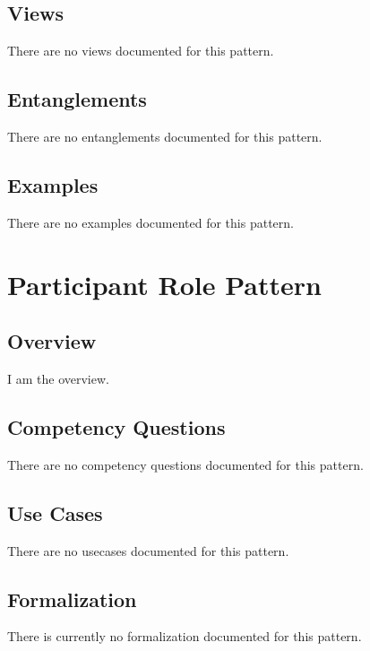 \subsection{Views}
\label{ssec:views}
There are no views documented for this pattern.


\subsection{Entanglements}
\label{ssec:entanglements}
There are no entanglements documented for this pattern.

\subsection{Examples}
\label{ssec:examples}
There are no examples documented for this pattern.


\section{Participant Role Pattern}
\label{sec:participant-role-pattern}
\subsection{Overview}
\label{ssec:overview}
I am the overview.

\subsection{Competency Questions}
\label{ssec:cqs}
There are no competency questions documented for this pattern.

\subsection{Use Cases}
\label{ssec:use-cases}
There are no usecases documented for this pattern.
\subsection{Formalization}
\label{ssec:formalization}
There is currently no formalization documented for this pattern.

